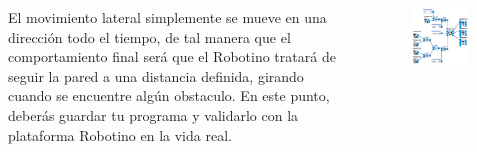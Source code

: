 \begin{frame}
	\begin{columns}
		El movimiento lateral simplemente se mueve en una dirección todo el tiempo, de tal manera que el comportamiento final será que el Robotino tratará de seguir la pared a una distancia definida, girando cuando se encuentre algún obstaculo. En este punto, deberás guardar tu programa y validarlo con la plataforma Robotino en la vida real.

		\begin{figure}
			\begin{center}
				\includegraphics[width=0.95\textwidth]{images/00-control-multiple/02.png}
			\end{center}
		\end{figure}
	\end{columns}
\end{frame}

